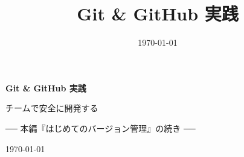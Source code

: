 \documentclass[book, paper=a4, fontsize=10.5pt, titlepage]{jlreq}
\title{Git \& GitHub 実践}
\author{}
\date{\today}
\begin{document}
\begin{titlepage}
  \centering
  \vspace*{4cm}
  {\sffamily\bfseries\Huge Git \& GitHub 実践\par}
  \vspace{1.2cm}
  {\sffamily\Large チームで安全に開発する\par}
  \vspace{0.6cm}
  {\sffamily\normalsize ── 本編『はじめてのバージョン管理』の続き ──\par}
  \vfill
  {\large \today\par}
\end{titlepage}

\tableofcontents
\clearpage




\appendix

\end{document}
